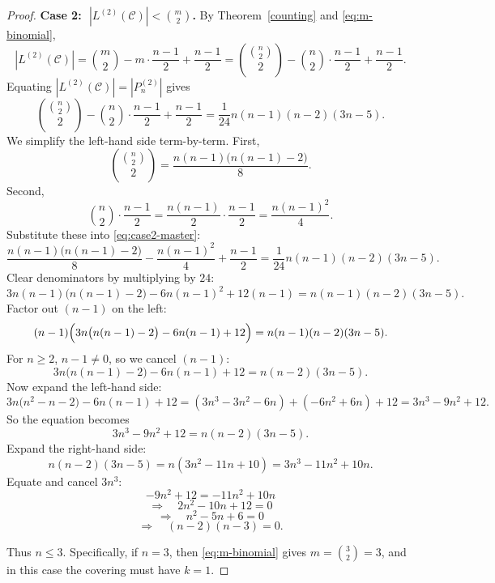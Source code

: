 \documentclass[10pt,a4paper]{amsart}
\begin{document}
\begin{proof}
\medskip
\noindent\textbf{Case 2: \(\;|L^{(2)}(\mathcal C)|<\binom{m}{2}\).}
By Theorem~\ref{counting} and \eqref{eq:m-binomial},
\[
|L^{(2)}(\mathcal C)|
=\binom{m}{2}-m\cdot\frac{n-1}{2}+\frac{n-1}{2}
=\binom{\binom{n}{2}}{2}-\binom{n}{2}\cdot\frac{n-1}{2}+\frac{n-1}{2}.
\]
Equating \( |L^{(2)}(\mathcal C)|=|P_n^{(2)}| \) gives
\begin{equation}\label{eq:case2-master}
\binom{\binom{n}{2}}{2}-\binom{n}{2}\cdot\frac{n-1}{2}+\frac{n-1}{2}
=\frac{1}{24}n(n-1)(n-2)(3n-5).
\end{equation}
We simplify the left-hand side term-by-term.
First,
\[
\binom{\binom{n}{2}}{2}=\frac{n(n-1)\bigl(n(n-1)-2\bigr)}{8}.
\]
Second,
\[
\binom{n}{2}\cdot\frac{n-1}{2}
=\frac{n(n-1)}{2}\cdot\frac{n-1}{2}
=\frac{n(n-1)^2}{4}.
\]
Substitute these into \eqref{eq:case2-master}:
\[
\frac{n(n-1)\bigl(n(n-1)-2\bigr)}{8}-\frac{n(n-1)^2}{4}+\frac{n-1}{2}
=\frac{1}{24}n(n-1)(n-2)(3n-5).
\]
Clear denominators by multiplying by \(24\):
\[
3n(n-1)\bigl(n(n-1)-2\bigr)-6n(n-1)^2+12(n-1)
= n(n-1)(n-2)(3n-5).
\]
Factor out \((n-1)\) on the left:
\[
(n-1)\Bigl(3n\bigl(n(n-1)-2\bigr)-6n(n-1)+12\Bigr)
= n(n-1)(n-2)(3n-5).
\]
For \(n\ge 2\), \(n-1\neq 0\), so we cancel \((n-1)\):
\[
3n\bigl(n(n-1)-2\bigr)-6n(n-1)+12
= n(n-2)(3n-5).
\]
Now expand the left-hand side:
\[
3n\bigl(n^2-n-2\bigr)-6n(n-1)+12
= (3n^3-3n^2-6n) + (-6n^2+6n) + 12
= 3n^3-9n^2+12.
\]
So the equation becomes
\[
3n^3-9n^2+12 = n(n-2)(3n-5).
\]
Expand the right-hand side:
\[
n(n-2)(3n-5)=n(3n^2-11n+10)=3n^3-11n^2+10n.
\]
Equate and cancel \(3n^3\):
\[
-9n^2+12 = -11n^2+10n
\]
\[
\Longrightarrow\quad 2n^2-10n+12=0
\]
\[
\Longrightarrow\quad n^2-5n+6=0
\]
\[
\Longrightarrow\quad (n-2)(n-3)=0.
\]

Thus \(n\leq 3\). Specifically, if $n=3$, then \eqref{eq:m-binomial} gives \(m=\binom{3}{2}=3\), and in this case the covering must have \(k=1\).
\end{proof}
\end{document}
